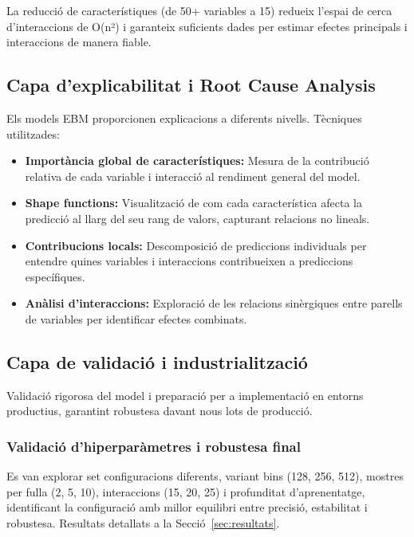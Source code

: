 La reducció de característiques (de 50+ variables a 15) redueix l'espai de cerca d'interaccions de O(n²) i garanteix suficients dades per estimar efectes principals i interaccions de manera fiable.

\subsection{Capa d'explicabilitat i Root Cause Analysis}
\label{subsec:capa_explicabilitat_rca}

Els models EBM proporcionen explicacions a diferents nivells. Tècniques utilitzades:

\begin{itemize}
    \item \textbf{Importància global de característiques:} Mesura de la contribució relativa de cada variable i interacció al rendiment general del model.
    \item \textbf{Shape functions:} Visualització de com cada característica afecta la predicció al llarg del seu rang de valors, capturant relacions no lineals.
    \item \textbf{Contribucions locals:} Descomposició de prediccions individuals per entendre quines variables i interaccions contribueixen a prediccions específiques.
    \item \textbf{Anàlisi d'interaccions:} Exploració de les relacions sinèrgiques entre parells de variables per identificar efectes combinats.
\end{itemize}

\subsection{Capa de validació i industrialització}
\label{subsec:capa_validacio_industrialitzacio}

Validació rigorosa del model i preparació per a implementació en entorns productius, garantint robustesa davant nous lots de producció.

\subsubsection{Validació d'hiperparàmetres i robustesa final}
\label{subsubsec:fase4_validacio_hiperparametres}

Es van explorar set configuracions diferents, variant bins (128, 256, 512), mostres per fulla (2, 5, 10), interaccions (15, 20, 25) i profunditat d'aprenentatge, identificant la configuració amb millor equilibri entre precisió, estabilitat i robustesa. Resultats detallats a la Secció~\ref{sec:resultats}.

